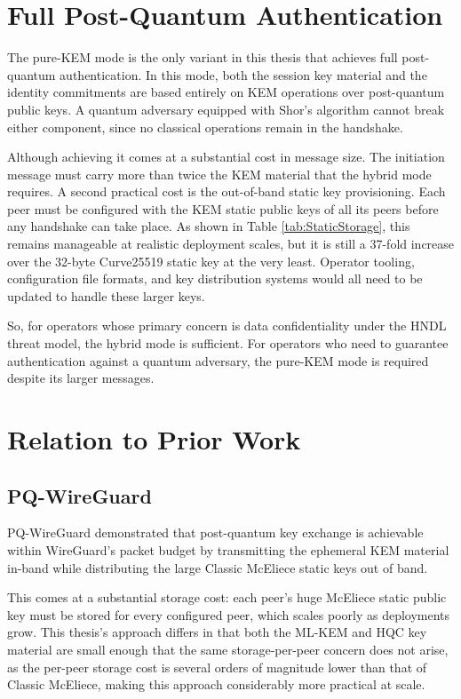 \section{Full Post-Quantum Authentication}
The pure-KEM mode is the only variant in this thesis that achieves full post-quantum authentication. In this mode, both the session key material and the identity commitments are based entirely on KEM operations over post-quantum public keys. A quantum adversary equipped with Shor's algorithm cannot break either component, since no classical operations remain in the handshake. 

Although achieving it comes at a substantial cost in message size. The initiation message must carry more than twice the KEM material that the hybrid mode requires. A second practical cost is the out-of-band static key provisioning. Each peer must be configured with the KEM static public keys of all its peers before any handshake can take place. As shown in Table \ref{tab:StaticStorage}, this remains manageable at realistic deployment scales, but it is still a 37-fold increase over the 32-byte Curve25519 static key at the very least. Operator tooling, configuration file formats, and key distribution systems would all need to be updated to handle these larger keys.

So, for operators whose primary concern is data confidentiality under the HNDL threat model, the hybrid mode is sufficient. For operators who need to guarantee authentication against a quantum adversary, the pure-KEM mode is required despite its larger messages.


\section{Relation to Prior Work}
\subsection{PQ-WireGuard}
PQ-WireGuard \cite{pqwg} demonstrated that post-quantum key exchange is achievable within WireGuard's packet budget by transmitting the ephemeral KEM material in-band while distributing the large Classic McEliece static keys out of band. 

This comes at a substantial storage cost: each peer's huge McEliece static public key must be stored for every configured peer, which scales poorly as deployments grow. This thesis's approach differs in that both the ML-KEM and HQC key material are small enough that the same storage-per-peer concern does not arise, as the per-peer storage cost is several orders of magnitude lower than that of Classic McEliece, making this approach considerably more practical at scale. 

